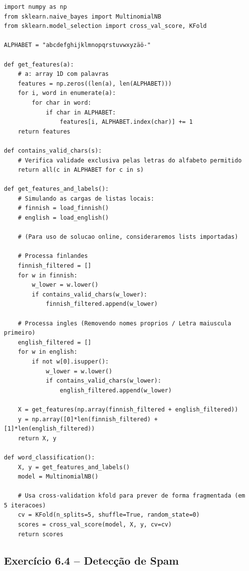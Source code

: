 \documentclass[11pt,a4paper]{article}
\begin{document}
\begin{solucao}
\begin{lstlisting}
import numpy as np
from sklearn.naive_bayes import MultinomialNB
from sklearn.model_selection import cross_val_score, KFold

ALPHABET = "abcdefghijklmnopqrstuvwxyzäö-"

def get_features(a):
    # a: array 1D com palavras
    features = np.zeros((len(a), len(ALPHABET)))
    for i, word in enumerate(a):
        for char in word:
            if char in ALPHABET:
                features[i, ALPHABET.index(char)] += 1
    return features

def contains_valid_chars(s):
    # Verifica validade exclusiva pelas letras do alfabeto permitido
    return all(c in ALPHABET for c in s)

def get_features_and_labels():
    # Simulando as cargas de listas locais:
    # finnish = load_finnish()
    # english = load_english()
    
    # (Para uso de solucao online, consideraremos lists importadas)
    
    # Processa finlandes
    finnish_filtered = []
    for w in finnish:
        w_lower = w.lower()
        if contains_valid_chars(w_lower):
            finnish_filtered.append(w_lower)
            
    # Processa ingles (Removendo nomes proprios / Letra maiuscula primeiro)
    english_filtered = []
    for w in english:
        if not w[0].isupper():
            w_lower = w.lower()
            if contains_valid_chars(w_lower):
                english_filtered.append(w_lower)
                
    X = get_features(np.array(finnish_filtered + english_filtered))
    y = np.array([0]*len(finnish_filtered) + [1]*len(english_filtered))
    return X, y

def word_classification():
    X, y = get_features_and_labels()
    model = MultinomialNB()
    
    # Usa cross-validation kfold para prever de forma fragmentada (em 5 iteracoes)
    cv = KFold(n_splits=5, shuffle=True, random_state=0)
    scores = cross_val_score(model, X, y, cv=cv)
    return scores
\end{lstlisting}
\end{solucao}

\subsection*{Exercício 6.4 -- Detecção de Spam}
\end{document}
